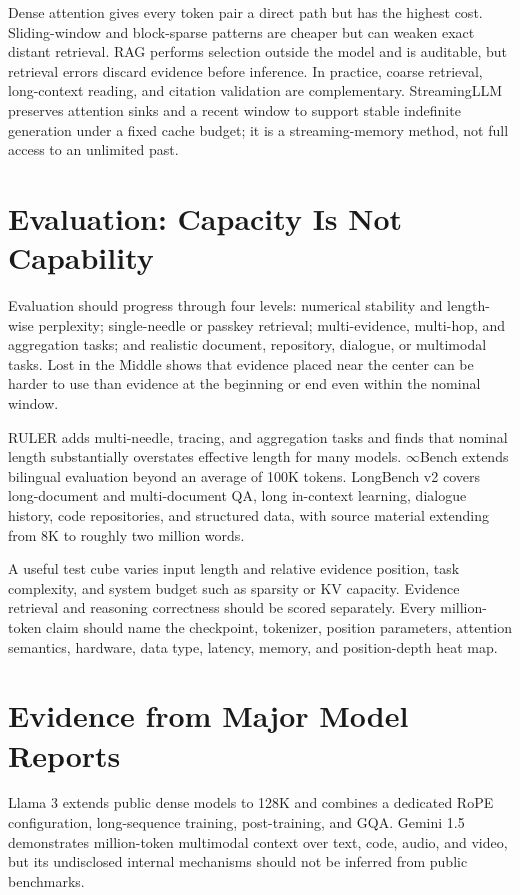 \documentclass[UTF8,10pt,a4paper,fontset=none]{ctexart}
\begin{document}
Dense attention gives every token pair a direct path but has the highest cost. Sliding-window and block-sparse patterns are cheaper but can weaken exact distant retrieval. RAG performs selection outside the model and is auditable, but retrieval errors discard evidence before inference. In practice, coarse retrieval, long-context reading, and citation validation are complementary. StreamingLLM preserves attention sinks and a recent window to support stable indefinite generation under a fixed cache budget\cite{xiao2023streamingllm}; it is a streaming-memory method, not full access to an unlimited past.

\section{Evaluation: Capacity Is Not Capability}

Evaluation should progress through four levels: numerical stability and length-wise perplexity; single-needle or passkey retrieval; multi-evidence, multi-hop, and aggregation tasks; and realistic document, repository, dialogue, or multimodal tasks. Lost in the Middle shows that evidence placed near the center can be harder to use than evidence at the beginning or end even within the nominal window\cite{liu2023lostmiddle}.

RULER adds multi-needle, tracing, and aggregation tasks and finds that nominal length substantially overstates effective length for many models\cite{hsieh2024ruler}. $\infty$Bench extends bilingual evaluation beyond an average of 100K tokens\cite{zhang2024infinitebench}. LongBench v2 covers long-document and multi-document QA, long in-context learning, dialogue history, code repositories, and structured data, with source material extending from 8K to roughly two million words\cite{bai2024longbenchv2}.

A useful test cube varies input length and relative evidence position, task complexity, and system budget such as sparsity or KV capacity. Evidence retrieval and reasoning correctness should be scored separately. Every million-token claim should name the checkpoint, tokenizer, position parameters, attention semantics, hardware, data type, latency, memory, and position-depth heat map.

\section{Evidence from Major Model Reports}

Llama 3 extends public dense models to 128K and combines a dedicated RoPE configuration, long-sequence training, post-training, and GQA\cite{llama3}. Gemini 1.5 demonstrates million-token multimodal context over text, code, audio, and video, but its undisclosed internal mechanisms should not be inferred from public benchmarks\cite{gemini15}.
\end{document}
